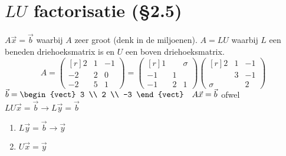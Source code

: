\section{$LU$ factorisatie (\S2.5)}
$A \vec{x} = \vec{b}$ waarbij $A$ zeer groot (denk in de miljoenen). $A = LU$ waarbij $L$ een beneden driehoeksmatrix is en $U$ een boven driehoeksmatrix.
\[ A = \begin{pmatrix*}[r]
	2 & 1 & -1 \\
	-2 & 2 & 0 \\
	-2 & 5 & 1
\end{pmatrix*} =
\begin{pmatrix*}[r]
	1 & & \sigma \\
	-1 & 1 &  \\
	-1 & 2 & 1 \end{pmatrix*}
\begin{pmatrix*}[r]
	2 & 1 & -1 \\
	& 3 & -1 \\
	\sigma & & 2
\end{pmatrix*} \]
$\vec{b} = \begin{vect} 3 \\ 2 \\ -3 \end{vect} \quad A \vec{x} = \vec{b}$ ofwel $LU \vec{x} = \vec{b} \to L \vec{y} = \vec{b}$
\begin{enumerate}
	\item $L \vec{y} = \vec{b} \to \vec{y}$
	\item $U \vec{x} = \vec{y}$
\end{enumerate}

